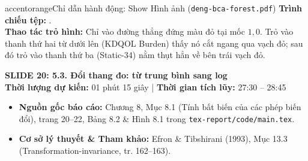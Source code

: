 \documentclass[10pt,a4paper]{article}
\newcommand{\slideheader}[4]{
    \vspace{0.4cm}
    \begin{tcolorbox}[colback=primary!7!white, colframe=primary, arc=2mm, boxrule=1pt, left=4mm, right=4mm, top=2.5mm, bottom=2.5mm]
        {\Large\bfseries\color{primary} SLIDE #1: #2}\\[0.1cm]
        {\small\textbf{Thời lượng dự kiến:} #3 \quad | \quad \textbf{Thời gian tích lũy:} #4}
    \end{tcolorbox}
    \vspace{0.15cm}
}
\begin{document}
\begin{actionbox}{accentorange}{Chỉ dẫn hành động: Show Hình ảnh (\texttt{deng-bca-forest.pdf})}
    \textbf{Trình chiếu tệp:} .\\
    \textbf{Thao tác trỏ hình:} Chỉ vào đường thẳng đứng màu đỏ tại mốc $1{,}0$. Trỏ vào thanh thứ hai từ dưới lên (KDQOL Burden) thấy nó cắt ngang qua vạch đỏ; sau đó trỏ vào thanh thứ ba (Static-34) nằm thụt hẳn về bên trái vạch đỏ.
\end{actionbox}

\newpage

\slideheader{20}{5.3. Đổi thang đo: từ trung bình sang log}{01 phút 15 giây}{27:30 -- 28:45}

\begin{itemize}
    \item \textbf{Nguồn gốc báo cáo:} Chương 8, Mục 8.1 (Tính bất biến của các phép biến đổi), trang 20--22, Bảng 8.2 \& Hình 8.1 trong \texttt{tex-report/code/main.tex}.
    \item \textbf{Cơ sở lý thuyết \& Tham khảo:} Efron \& Tibshirani (1993), Mục 13.3 (Transformation-invariance, tr. 162--163).
\end{itemize}
\end{document}
